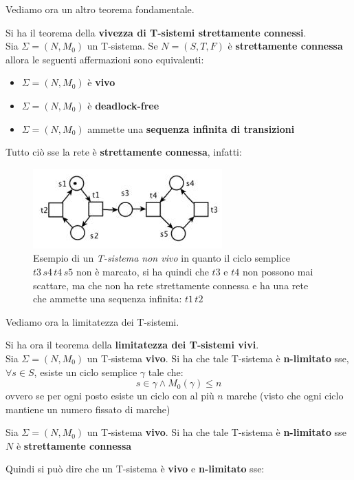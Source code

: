 \documentclass[a4paper,12pt, oneside]{book}
\begin{document}
Vediamo ora un altro teorema fondamentale.
\begin{teorema}
  Si ha il teorema della \textbf{vivezza di T-sistemi strettamente connessi}.\\
  Sia $\Sigma =(N,M_0)$ un T-sistema. Se $N=(S,T,F)$ è \textbf{strettamente
    connessa} allora le seguenti affermazioni sono equivalenti:
  \begin{itemize}
    \item $\Sigma =(N,M_0)$ è \textbf{vivo}
    \item $\Sigma =(N,M_0)$ è \textbf{deadlock-free}
    \item $\Sigma =(N,M_0)$ ammette una \textbf{sequenza infinita di
      transizioni} 
  \end{itemize}
  Tutto ciò sse la rete è \textbf{strettamente connessa}, infatti:
  \begin{figure}[H]
    \centering
    \includegraphics[scale = 0.6]{img/tsi4.jpg}
    \caption{Esempio di un \emph{T-sistema non vivo} in quanto il ciclo semplice
      $t3\,s4\,t4\,s5$ non è marcato, si ha quindi che $t3$ e $t4$ non
      possono mai scattare, ma che non ha rete strettamente connessa e ha una
      rete che ammette una sequenza infinita: $t1\,t2$}
  \end{figure}
\end{teorema}
Vediamo ora la limitatezza dei T-sistemi.
\begin{teorema}
  Si ha ora il teorema della \textbf{limitatezza dei T-sistemi vivi}.\\
  Sia $\Sigma =(N,M_0)$ un T-sistema \textbf{vivo}. Si ha che tale T-sistema è
  \textbf{n-limitato} sse, $\forall s\in S$, esiste un ciclo semplice $\gamma$
  tale che:
  \[s\in \gamma\land M_0(\gamma)\leq n\]
  ovvero se per ogni posto esiste un ciclo con al più $n$ marche (visto che
  ogni ciclo mantiene un numero fissato di marche)
\end{teorema}
\begin{corollario}
  Sia $\Sigma =(N,M_0)$ un T-sistema \textbf{vivo}. Si ha che tale T-sistema è
  \textbf{n-limitato} sse $N$ è \textbf{strettamente connessa}
\end{corollario}
Quindi si può dire che un T-sistema è \textbf{vivo} e \textbf{n-limitato} sse:
\end{document}
